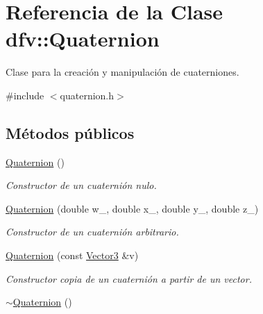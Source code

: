 \hypertarget{classdfv_1_1Quaternion}{\section{\-Referencia de la \-Clase dfv\-:\-:\-Quaternion}
\label{classdfv_1_1Quaternion}
}


\-Clase para la creación y manipulación de cuaterniones.  




{\ttfamily \#include $<$quaternion.\-h$>$}

\subsection*{\-Métodos públicos}
\begin{DoxyCompactItemize}
\item 
\hyperlink{classdfv_1_1Quaternion_afee1dba2a8d14027e8c126fcf1e95f05}{\-Quaternion} ()
\begin{DoxyCompactList}\small\item\em \-Constructor de un cuaternión nulo. \end{DoxyCompactList}\item 
\hyperlink{classdfv_1_1Quaternion_a239d4109488e9f46124aeabd6180ea20}{\-Quaternion} (double w\-\_\-, double x\-\_\-, double y\-\_\-, double z\-\_\-)
\begin{DoxyCompactList}\small\item\em \-Constructor de un cuaternión arbitrario. \end{DoxyCompactList}\item 
\hyperlink{classdfv_1_1Quaternion_a0f89714025bf6e5a7a6a5bfb2f1271d6}{\-Quaternion} (const \hyperlink{classdfv_1_1Vector3}{\-Vector3} \&v)
\begin{DoxyCompactList}\small\item\em \-Constructor copia de un cuaternión a partir de un vector. \end{DoxyCompactList}\item 
\hypertarget{classdfv_1_1Quaternion_a00b2b86c30aec69e96fd17bbedea3306}{\hyperlink{classdfv_1_1Quaternion_a00b2b86c30aec69e96fd17bbedea3306}{$\sim$\-Quaternion} ()}\label{classdfv_1_1Quaternion_a00b2b86c30aec69e96fd17bbedea3306}


\end{DoxyCompactItemize}
